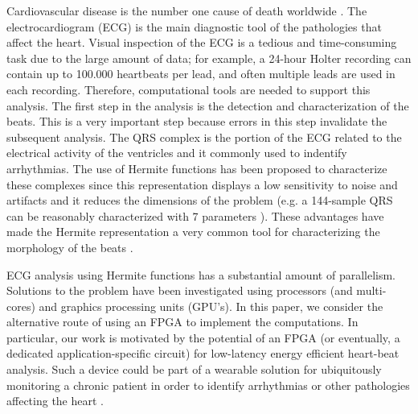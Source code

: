 \documentclass[conference]{IEEEtran}
\begin{document}




%
\IEEEpeerreviewmaketitle



Cardiovascular disease is the number one cause of death worldwide \cite{j:lagerholm00}. The
electrocardiogram (ECG) is the main diagnostic tool of the pathologies that affect the heart. Visual inspection of the ECG is a tedious and time-consuming task due to the large amount of data; for example, a 24-hour Holter recording can contain up to 100.000 heartbeats per lead, and often multiple leads are used in each recording. Therefore,
computational tools are needed to support this analysis. The first step in the analysis is the detection and characterization of the beats. This is a very important step because errors in this step invalidate the subsequent analysis. The QRS complex is the portion of the ECG related to the electrical activity of the ventricles and it commonly used to indentify arrhythmias\cite{j:lagerholm00, c:marquez13}. The use of Hermite functions has been proposed to characterize these complexes since %
this representation displays a low sensitivity to noise and artifacts and it reduces the dimensions of the problem (e.g. a 144-sample QRS can be reasonably characterized with 7 parameters \cite{c:marquez13}). 
These advantages have made the Hermite representation a very common tool for characterizing the 
morphology of the beats \cite{j:lagerholm00,c:marquez13,c:braccini97,j:linh03}. 

ECG analysis using Hermite functions has a
substantial amount of parallelism.  Solutions to the problem have been investigated
using processors (and multi-cores) and graphics processing units (GPU's). 
In this paper, we consider the alternative route of using an FPGA to implement
the computations.  In particular, our work is motivated by the potential
of an FPGA (or eventually, a dedicated application-specific circuit) for low-latency
energy efficient heart-beat analysis.  Such a device could be part of a wearable solution 
for ubiquitously monitoring a chronic patient in order to identify arrhythmias or other pathologies affecting the heart \cite{c:philipp13,c:voykin13}.
\end{document}
